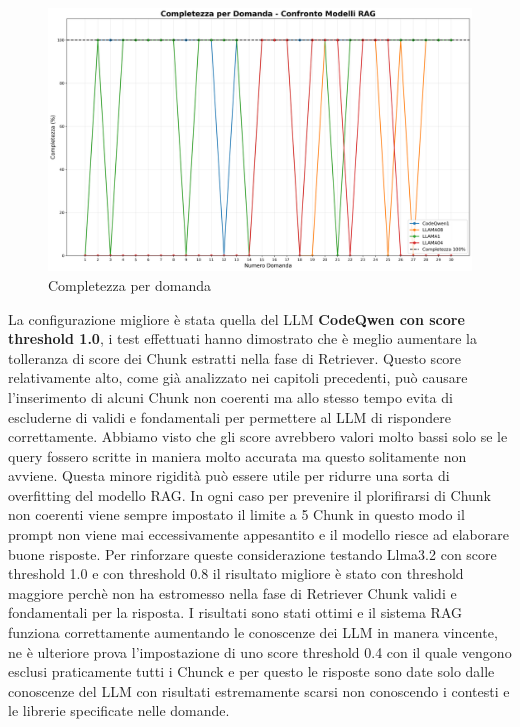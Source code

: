 \documentclass[12pt,a4paper,openright,twoside]{book}
\begin{document}
\begin{figure}[h]
    \centering
    \includegraphics[width=\textwidth]{figures/completezza_per_domanda.png}
    \caption{Completezza per domanda}
    \label{fig:completezza-per-domanda}
\end{figure}
La configurazione migliore è stata quella del LLM \textbf{CodeQwen con score threshold 1.0},
i test effettuati hanno dimostrato che è meglio aumentare la tolleranza di score dei Chunk estratti nella fase di Retriever.
Questo score relativamente alto, come già analizzato nei capitoli precedenti, può causare l'inserimento di alcuni Chunk non coerenti ma allo stesso tempo evita di escluderne di validi e fondamentali per permettere al LLM di rispondere correttamente.
Abbiamo visto che gli score avrebbero valori molto bassi solo se le query fossero scritte in maniera molto accurata ma questo solitamente non avviene.
Questa minore rigidità può essere utile per ridurre una sorta di overfitting del modello RAG.
In ogni caso per prevenire il plorifirarsi di Chunk non coerenti viene sempre impostato il limite a 5 Chunk in questo modo il prompt non viene mai eccessivamente appesantito e il modello riesce ad elaborare buone risposte.
Per rinforzare queste considerazione testando Llma3.2 con score threshold 1.0 e con threshold 0.8 il risultato migliore è stato con threshold maggiore perchè non ha estromesso nella fase di Retriever Chunk validi e fondamentali per la risposta.
I risultati sono stati ottimi e il sistema RAG funziona correttamente aumentando le conoscenze dei LLM in manera vincente,
ne è ulteriore prova l'impostazione di uno score threshold 0.4 con il quale vengono esclusi praticamente tutti i Chunck e per questo le risposte sono date solo dalle conoscenze del LLM con risultati estremamente scarsi non conoscendo i contesti e le librerie specificate nelle domande.
\end{document}
